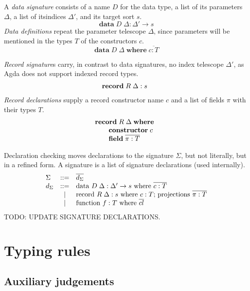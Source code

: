 \documentclass[acmlarge,fleqn]{acmart}\settopmatter{}
\begin{document}
A \emph{data signature} consists of a name $D$ for the data type,
a list of its parameters $\Delta$,
a list of itsindices $\Delta'$,
and its target sort $s$.
\[
\textbf{data}\; D\; \Delta : \Delta' \to s
\]
\emph{Data definitions} repeat the parameter telescope $\Delta$,
since parameters will be mentioned in the types $T$ of the constructors $c$.
\[
\textbf{data}\; D\; \Delta \;\textbf{where}\; \overline{c : T}
\]

\emph{Record signature}s carry, in contrast to data signatures,
no index telescope $\Delta'$, as Agda does not support indexed record types.
\[
\begin{array}{@{}l}
\textbf{record}\; R\; \Delta : s
\end{array}
\]
\emph{Record declarations} supply a record constructor name $c$
and a list of fields $\pi$ with their types $T$.
\[
\begin{array}{@{}l}
\textbf{record}\; R\; \Delta \; \textbf{where} \\
\qquad  \textbf{constructor}\; c \\
\qquad  \textbf{field}\; \overline{\pi : T} \\
\end{array}
\]

Declaration checking moves declarations to the signature $\Sigma$,
but not literally, but in a refined form.
A signature is a list of signature declarations (used internally).
\[
\begin{array}{lcl}
\Sigma & ::= &  \overline{d_\Sigma} \\
d_\Sigma & ::= & \text{data } D\; \Delta : \Delta' \to s \text{ where } \overline{c : T} \\
& \mid & \text{record } R\;\Delta : s \text{ where $c : T$; } \text{projections } \overline{\pi : T} \\
& \mid & \text{function } f : T \text{ where } \overline{cl}
\end{array}
\]
TODO: UPDATE SIGNATURE DECLARATIONS.




\section{Typing rules}
\label{sec:typing}


\subsection{Auxiliary judgements}
\end{document}
